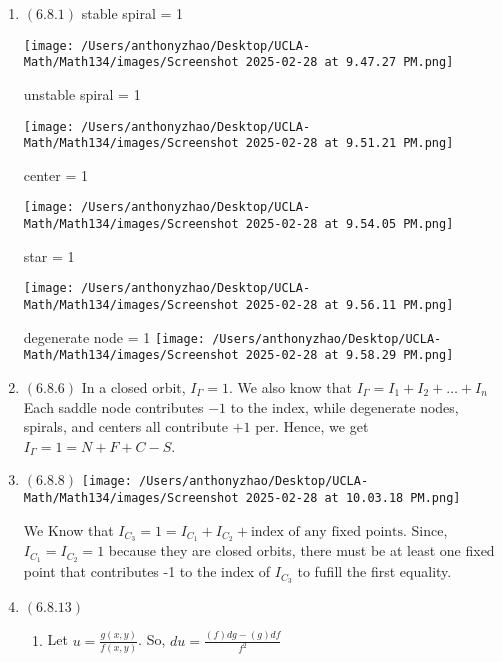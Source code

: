 \documentclass[12pt]{article}
\begin{document}

\begin{enumerate}[start=1,label={\bfseries Problem \arabic*:},leftmargin=1in] %
    \item $(6.8.1)$
    stable spiral = 1

    \texttt{[image: /Users/anthonyzhao/Desktop/UCLA-Math/Math134/images/Screenshot 2025-02-28 at 9.47.27 PM.png]}
    
    unstable spiral = 1

    \texttt{[image: /Users/anthonyzhao/Desktop/UCLA-Math/Math134/images/Screenshot 2025-02-28 at 9.51.21 PM.png]}

    center = 1

    \texttt{[image: /Users/anthonyzhao/Desktop/UCLA-Math/Math134/images/Screenshot 2025-02-28 at 9.54.05 PM.png]}

    star = 1

    \texttt{[image: /Users/anthonyzhao/Desktop/UCLA-Math/Math134/images/Screenshot 2025-02-28 at 9.56.11 PM.png]}

    degenerate node = 1
    \texttt{[image: /Users/anthonyzhao/Desktop/UCLA-Math/Math134/images/Screenshot 2025-02-28 at 9.58.29 PM.png]}

    \item $(6.8.6)$ In a closed orbit, $I_{\Gamma} = 1$. We also know that $I_{\Gamma} = I_{1} + I_{2} + \dots + I_{n}$
    Each saddle node contributes $-1$ to the index, while degenerate nodes, spirals, and centers all contribute $+1$ per. 
    Hence, we get $I_{\Gamma} = 1 = N + F + C - S$. 
    \item $(6.8.8)$ 
    \texttt{[image: /Users/anthonyzhao/Desktop/UCLA-Math/Math134/images/Screenshot 2025-02-28 at 10.03.18 PM.png]}

    We Know that $I_{C_{3}} = 1 = I_{C_{1}} + I_{C_{2}} + \text{index of any fixed points}$. Since, $I_{C_{1}} = I_{C_{2}} = 1$ because they are closed orbits, 
    there must be at least one fixed point that contributes -1 to the index of $I_{C_{3}}$ to fufill the first equality. 
    \item $(6.8.13)$
    \begin{enumerate}
        \item Let $u = \frac{g(x,y)}{f(x,y)}$.
        So, $du = \frac{(f)dg - (g)df}{f^{2}}$ 


\end{enumerate}
\end{enumerate}
\end{document}
